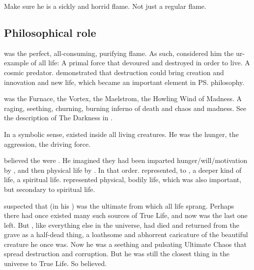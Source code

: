Make sure he is a sickly and horrid flame. 
Not just a regular flame. 










\subsection{Philosophical role}
\RuinSatha was the perfect, all-consuming, purifying flame. 
As such,  considered him the ur-example of all life: 
A primal force that devoured and destroyed in order to live. 
A cosmic predator. 
\RuinSatha demonstrated that destruction could bring creation and innovation and new life, which became an important element in \ps{\Sethicus} philosophy. 

\RuinSatha was the Furnace, the Vortex, the Maelstrom, the Howling Wind of Madness. 
A raging, seething, churning, burning inferno of death and chaos and madness.
See the description of The Darkness in \cite{CLMoore:TheDarkLand}. 

In a symbolic sense, \RuinSatha existed inside all living creatures.
He was the hunger, the aggression, the driving force. 

\Sethicus believed the \ophidians were .
He imagined they had been imparted hunger/will/motivation by \RuinSatha, and then physical life by \KhothSell. 
In that order. 
\RuinSatha represented, to \Sethicus, a deeper kind of life, a spiritual life. 
\KhothSell represented physical, bodily life, which was also important, but secondary to spiritual life. 

\Sethicus suspected that \RuinSatha (in his ) was the ultimate \dweomer from which all life sprang.
Perhaps there had once existed many such sources of True Life, and now \RuinSatha was the last one left. 
But \RuinSatha, like everything else in the universe, had died and returned from the grave as a half-dead thing, a loathsome and abhorrent caricature of the beautiful creature he once was. 
Now he was a seething and pulsating Ultimate Chaos that spread destruction and corruption.
But he was still the closest thing in the universe to True Life.
So \Sethicus believed. 









